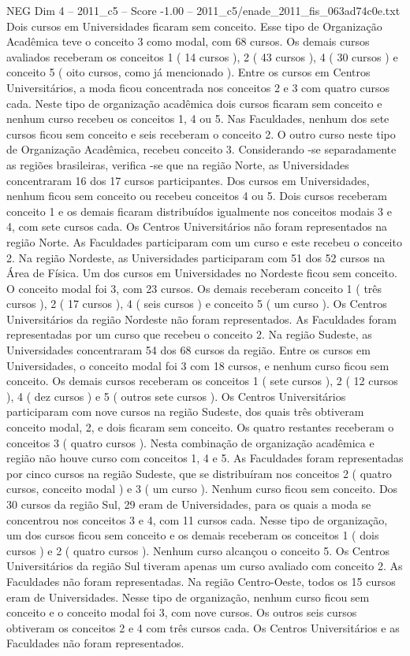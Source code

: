 \begin{textsample}{NEG Dim 4 – 2011\_c5 – Score -1.00 – 2011\_c5/enade\_2011\_fis\_063ad74c0e.txt}
Dois cursos em Universidades ficaram sem conceito.
Esse tipo de Organização Acadêmica teve o conceito 3 como modal, com 68 cursos.
Os demais cursos avaliados receberam os conceitos 1 ( 14 cursos ), 2 ( 43 cursos ), 4 ( 30 cursos ) e conceito 5 ( oito cursos, como já mencionado ).
Entre os cursos em Centros Universitários, a moda ficou concentrada nos conceitos 2 e 3 com quatro cursos cada.
Neste tipo de organização acadêmica dois cursos ficaram sem conceito e nenhum curso recebeu os conceitos 1, 4 ou 5.
Nas Faculdades, nenhum dos sete cursos ficou sem conceito e seis receberam o conceito 2.
O outro curso neste tipo de Organização Acadêmica, recebeu conceito 3.
Considerando -se separadamente as regiões brasileiras, verifica -se que na região Norte, as Universidades concentraram 16 dos 17 cursos participantes.
Dos cursos em Universidades, nenhum ficou sem conceito ou recebeu conceitos 4 ou 5.
Dois cursos receberam conceito 1 e os demais ficaram distribuídos igualmente nos conceitos modais 3 e 4, com sete cursos cada.
Os Centros Universitários não foram representados na região Norte.
As Faculdades participaram com um curso e este recebeu o conceito 2.
Na região Nordeste, as Universidades participaram com 51 dos 52 cursos na Área de Física.
Um dos cursos em Universidades no Nordeste ficou sem conceito.
O conceito modal foi 3, com 23 cursos.
Os demais receberam conceito 1 ( três cursos ), 2 ( 17 cursos ), 4 ( seis cursos ) e conceito 5 ( um curso ).
Os Centros Universitários da região Nordeste não foram representados.
As Faculdades foram representadas por um curso que recebeu o conceito 2.
Na região Sudeste, as Universidades concentraram 54 dos 68 cursos da região.
Entre os cursos em Universidades, o conceito modal foi 3 com 18 cursos, e nenhum curso ficou sem conceito.
Os demais cursos receberam os conceitos 1 ( sete cursos ), 2 ( 12 cursos ), 4 ( dez cursos ) e 5 ( outros sete cursos ).
Os Centros Universitários participaram com nove cursos na região Sudeste, dos quais três obtiveram conceito modal, 2, e dois ficaram sem conceito.
Os quatro restantes receberam o conceitos 3 ( quatro cursos ).
Nesta combinação de organização acadêmica e região não houve curso com conceitos 1, 4 e 5.
As Faculdades foram representadas por cinco cursos na região Sudeste, que se distribuíram nos conceitos 2 ( quatro cursos, conceito modal ) e 3 ( um curso ).
Nenhum curso ficou sem conceito.
Dos 30 cursos da região Sul, 29 eram de Universidades, para os quais a moda se concentrou nos conceitos 3 e 4, com 11 cursos cada.
Nesse tipo de organização, um dos cursos ficou sem conceito e os demais receberam os conceitos 1 ( dois cursos ) e 2 ( quatro cursos ).
Nenhum curso alcançou o conceito 5.
Os Centros Universitários da região Sul tiveram apenas um curso avaliado com conceito 2.
As Faculdades não foram representadas.
Na região Centro-Oeste, todos os 15 cursos eram de Universidades.
Nesse tipo de organização, nenhum curso ficou sem conceito e o conceito modal foi 3, com nove cursos.
Os outros seis cursos obtiveram os conceitos 2 e 4 com três cursos cada.
Os Centros Universitários e as Faculdades não foram representados.

\end{textsample}
